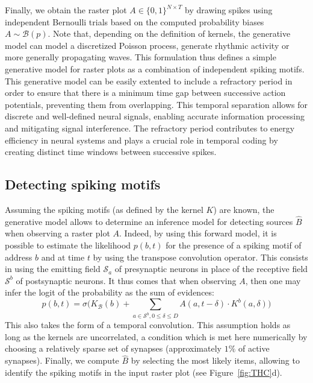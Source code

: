 \documentclass[runningheads]{llncs}
\newcommand{\presynaddr}{a} %
\newcommand{\postsynaddr}{b} %
\newcommand{\postsynaddrspace}{\mathcal{B}} %
\newcommand{\synapse}{\mathcal{S}} %
\newcommand{\synapticdelay}{\delta} %
\newcommand{\kernel}{K} %
\begin{document}
Finally, we obtain the raster plot $A\in \{0, 1\}^{N\times T}$ by drawing spikes using independent Bernoulli trials based on the computed probability biases $A \sim \mathcal{B}(p)$. Note that, depending on the definition of kernels, the generative model can model a discretized Poisson process, generate rhythmic activity or more generally propagating waves. This formulation thus defines a simple generative model for raster plots as a combination of independent spiking motifs.  This generative model can be easily extented to include a refractory period in order to ensure that there is a minimum time gap between successive action potentials, preventing them from overlapping. This temporal separation allows for discrete and well-defined neural signals, enabling accurate information processing and mitigating signal interference. The refractory period contributes to energy efficiency in neural systems and plays a crucial role in temporal coding by creating distinct time windows between successive spikes. 
%
\subsection{Detecting spiking motifs}
% 
Assuming the spiking motifs (as defined by the kernel $\kernel$) are known, the generative model allows to determine an inference model for detecting sources $\hat{B}$ when observing a raster plot $A$. Indeed, by using this forward model, it is possible to estimate the likelihood $p(b, t)$ for the presence of a spiking motif of address $b$ and at time $t$ by using the transpose convolution operator. This consists in using the emitting field $\synapse_\presynaddr$ of presynaptic neurons in place of the receptive field $\synapse^\postsynaddr$ of postsynaptic neurons. It thus comes that when observing $A$, then one may infer the logit of the probability as the sum of evidences:
\begin{equation*}
  p(\postsynaddr, t) = \sigma\big(\kernel_\postsynaddrspace(b) + \sum_{\presynaddr \in \synapse^\postsynaddr,  0 \le \synapticdelay \le D} A(\presynaddr, t-\synapticdelay) \cdot \kernel^\postsynaddr(\presynaddr, \synapticdelay) \big)  
\end{equation*}
This also takes the form of a temporal convolution. This assumption holds as long as the kernels are uncorrelated, a condition which is met here numerically by choosing a relatively sparse set of synapses (approximately $1\%$ of active synapses). Finally, we compute $\hat{B}$ by selecting the most likely items, allowing to identify the spiking motifs in the input raster plot (see Figure~\ref{fig:THC}d). 
\end{document}
